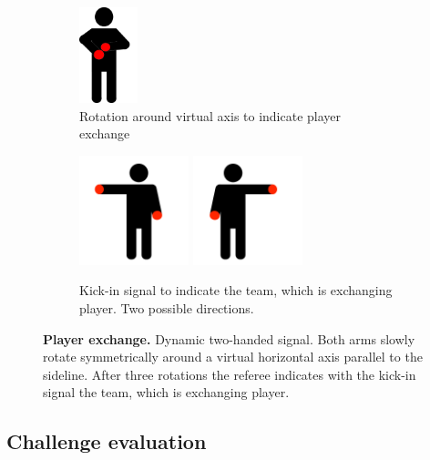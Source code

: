 \begin{figure}[ht!]
    \centering
    \begin{subfigure}{.33\textwidth}
        \centering
        \includegraphics[height=105px]{figs/technical_challenges/player_exchange.png}
        \vspace*{0.5em}
        \caption{Rotation around virtual axis to indicate player exchange}
    \end{subfigure}
    \hspace*{0.5em}
    \begin{subfigure}{.6\textwidth}
        \centering
        \includegraphics[height=120px]{figs/technical_challenges/kick-in.png}
        \includegraphics[height=120px]{figs/technical_challenges/kick-in-flipped.png}
        \caption{Kick-in signal to indicate the team, which is exchanging player. Two possible directions.}
    \end{subfigure}
    \caption{\textbf{Player exchange.} Dynamic two-handed signal. Both arms slowly rotate symmetrically around a virtual horizontal axis parallel to the sideline. After three rotations the referee indicates with the kick-in signal the team, which is exchanging player.}
\end{figure}

\clearpage
\newpage

\subsection{Challenge evaluation}

